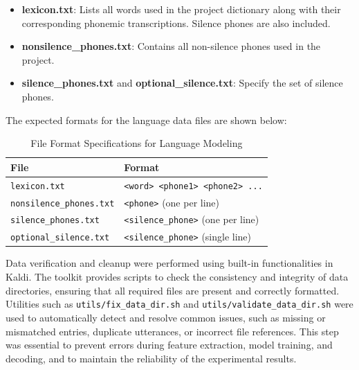 \begin{itemize}
    \item \textbf{lexicon.txt}: Lists all words used in the project dictionary along with their corresponding phonemic transcriptions. Silence phones are also included.
    \item \textbf{nonsilence\_phones.txt}: Contains all non-silence phones used in the project.
    \item \textbf{silence\_phones.txt} and \textbf{optional\_silence.txt}: Specify the set of silence phones.
\end{itemize}

\vspace{1em}

The expected formats for the language data files are shown below:

\begin{table}[H]
\centering
\renewcommand{\arraystretch}{1.3}
\setlength{\tabcolsep}{10pt}
\caption{File Format Specifications for Language Modeling}
\label{tab:languageformats}
\begin{tabular}{|l|l|}
\hline
\textbf{File} & \textbf{Format} \\
\hline
\texttt{lexicon.txt} & \texttt{<word> <phone1> <phone2> ...} \\
\texttt{nonsilence\_phones.txt} & \texttt{<phone>} (one per line) \\
\texttt{silence\_phones.txt} & \texttt{<silence\_phone>} (one per line) \\
\texttt{optional\_silence.txt} & \texttt{<silence\_phone>} (single line) \\
\hline
\end{tabular}
\end{table}

\vspace{1em}

Data verification and cleanup were performed using built-in functionalities in Kaldi. The toolkit provides scripts to check the consistency and integrity of data directories, ensuring that all required files are present and correctly formatted. Utilities such as \texttt{utils/fix\_data\_dir.sh} and \texttt{utils/validate\_data\_dir.sh} were used to automatically detect and resolve common issues, such as missing or mismatched entries, duplicate utterances, or incorrect file references. This step was essential to prevent errors during feature extraction, model training, and decoding, and to maintain the reliability of the experimental results.

